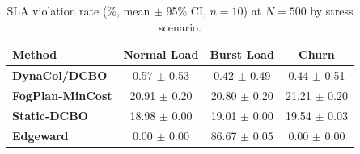 \begin{table}[!t]
\centering
\caption{SLA violation rate (\%, mean $\pm$ 95\% CI, $n=10$) at $N=500$ by stress scenario.}
\label{tab:sla_n500}
\fgcsTableCol
\begin{tabular*}{\columnwidth}{@{\extracolsep{\fill}}lccc@{}}
\toprule
\textbf{Method} & \textbf{Normal Load} & \textbf{Burst Load} & \textbf{Churn} \\
\midrule
\textcolor{dynacolBlue}{\textbf{DynaCol/DCBO}} & 0.57 $\pm$ 0.53 & 0.42 $\pm$ 0.49 & 0.44 $\pm$ 0.51 \\
\textcolor{dynacolOrange}{\textbf{FogPlan-MinCost}} & 20.91 $\pm$ 0.20 & 20.80 $\pm$ 0.20 & 21.21 $\pm$ 0.20 \\
\textcolor{dynacolTeal}{\textbf{Static-DCBO}} & 18.98 $\pm$ 0.00 & 19.01 $\pm$ 0.00 & 19.54 $\pm$ 0.03 \\
\textcolor{dynacolPurple}{\textbf{Edgeward}} & 0.00 $\pm$ 0.00 & 86.67 $\pm$ 0.05 & 0.00 $\pm$ 0.00 \\
\bottomrule
\end{tabular*}
\end{table}